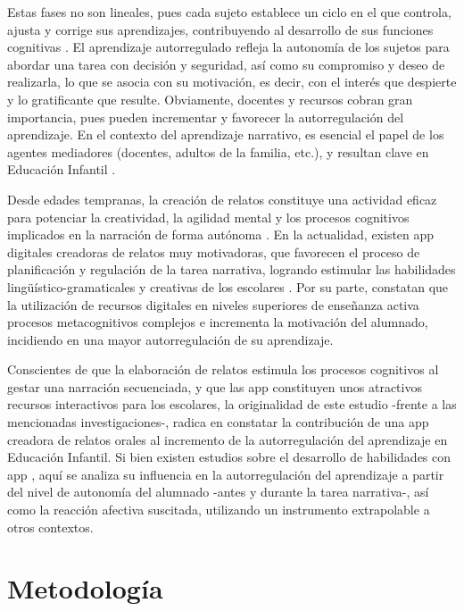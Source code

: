 \documentclass[spanish]{textolivre}
\begin{document}
Estas fases no son lineales, pues cada sujeto establece un ciclo en el que controla, ajusta y corrige sus aprendizajes, contribuyendo al desarrollo de sus funciones cognitivas \cite{colomina_observacion_1997}. El aprendizaje autorregulado refleja la autonomía de los sujetos para abordar una tarea con decisión y seguridad, así como su compromiso y deseo de realizarla, lo que se asocia con su motivación, es decir, con el interés que despierte y lo gratificante que resulte. Obviamente, docentes y recursos cobran gran importancia, pues pueden incrementar y favorecer la autorregulación del aprendizaje. En el contexto del aprendizaje narrativo, es esencial el papel de los agentes mediadores (docentes, adultos de la familia, etc.), y resultan clave en Educación Infantil \cite{torremocha_libros_2002}.

Desde edades tempranas, la creación de relatos constituye una actividad eficaz para potenciar la creatividad, la agilidad mental y los procesos cognitivos implicados en la narración de forma autónoma \cite{addone_engaging_2022}. En la actualidad, existen app digitales creadoras de relatos muy motivadoras, que favorecen el proceso de planificación y regulación de la tarea narrativa, logrando estimular las habilidades lingüístico-gramaticales y creativas de los escolares \cite{del-moral_aportaciones_2021}. Por su parte, \textcite{infante-villagran_aplicaciones_2021} constatan que la utilización de recursos digitales en niveles superiores de enseñanza activa procesos metacognitivos complejos e incrementa la motivación del alumnado, incidiendo en una mayor autorregulación de su aprendizaje.

Conscientes de que la elaboración de relatos estimula los procesos cognitivos al gestar una narración secuenciada, y que las app constituyen unos atractivos recursos interactivos para los escolares, la originalidad de este estudio -frente a las mencionadas investigaciones-, radica en constatar la contribución de una app creadora de relatos orales al incremento de la autorregulación del aprendizaje en Educación Infantil. Si bien existen estudios sobre el desarrollo de habilidades con app  \cite{abdel-reheem_amin_review_2020,rodriguez_digital_2021}, aquí se analiza su influencia en la autorregulación del aprendizaje a partir del nivel de autonomía del alumnado -antes y durante la tarea narrativa-, así como la reacción afectiva suscitada, utilizando un instrumento extrapolable a otros contextos. 


\section{Metodología}\label{sec-metodologia}
\end{document}
